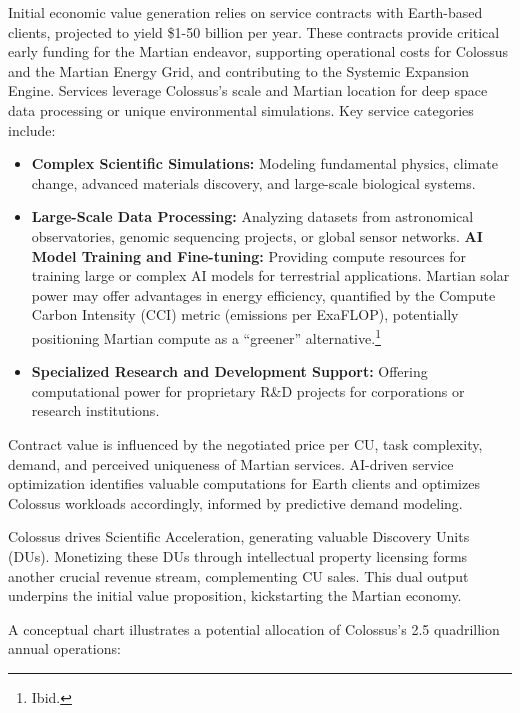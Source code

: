 \documentclass[fontsize=10pt, oneside, DIV=calc]{scrartcl}
\begin{document}
\noindent
Initial economic value generation relies on service contracts with Earth-based clients, projected to yield \$1-50 billion per year. These contracts provide critical early funding for the Martian endeavor, supporting operational costs for Colossus and the Martian Energy Grid, and contributing to the Systemic Expansion Engine. Services leverage Colossus's scale and Martian location for deep space data processing or unique environmental simulations. Key service categories include:
\begin{itemize}
    \item \textbf{Complex Scientific Simulations:} Modeling fundamental physics, climate change, advanced materials discovery, and large-scale biological systems.
    \item \textbf{Large-Scale Data Processing:} Analyzing datasets from astronomical observatories, genomic sequencing projects, or global sensor networks.
    \textbf{AI Model Training and Fine-tuning:} Providing compute resources for training large or complex AI models for terrestrial applications. Martian solar power may offer advantages in energy efficiency, quantified by the Compute Carbon Intensity (CCI) metric (emissions per ExaFLOP), potentially positioning Martian compute as a ``greener'' alternative.\footnote{Ibid.}
    \item \textbf{Specialized Research and Development Support:} Offering computational power for proprietary R\&D projects for corporations or research institutions.
\end{itemize}
Contract value is influenced by the negotiated price per CU, task complexity, demand, and perceived uniqueness of Martian services. AI-driven service optimization identifies valuable computations for Earth clients and optimizes Colossus workloads accordingly, informed by predictive demand modeling.

\medskip

\noindent
Colossus drives Scientific Acceleration, generating valuable Discovery Units (DUs). Monetizing these DUs through intellectual property licensing forms another crucial revenue stream, complementing CU sales. This dual output underpins the initial value proposition, kickstarting the Martian economy.

\medskip

\noindent
A conceptual chart illustrates a potential allocation of Colossus's 2.5 quadrillion annual operations:
\end{document}
